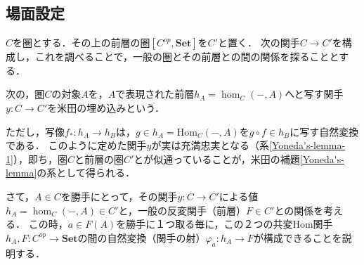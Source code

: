 \documentclass[uplatex, 12pt, dvipdfmx]{jsreport}
\begin{document}
\subsection{場面設定}

$C$を圏とする．その上の前層の圏$[C^{op},\mathbf{Set}]$を$C'$と置く．
次の関手$C\to C'$を構成し，これを調べることで，一般の圏とその前層との間の関係を探ることとする．

\begin{definition}
    次の，圏$C$の対象$A$を，$A$で表現された前層$h_A=\hom_C(-,A)$へと写す関手$y:C\to C'$を米田の埋め込みという．
    \begin{center}\end{center}
    ただし，写像$f_*:h_A\to h_B$は，$g\in h_A=\mathrm{Hom}_C(-,A)$を$g\circ f\in h_B$に写す自然変換である．
    このように定めた関手$y$が実は充満忠実となる（系\ref{Yoneda's-lemma-1}），即ち，圏$C$と前層の圏$C'$とが似通っていることが，米田の補題\ref{Yoneda's-lemma}の系として得られる．
\end{definition}

さて，$A\in C$を勝手にとって，その関手$y:C\to C'$による値$h_A=\hom_C(-,A) \in C'$と，一般の反変関手（前層）$F\in C'$との関係を考える．
この時，$a\in F(A)$を勝手に１つ取る毎に，この２つの共変Hom関手$h_A,F:C^{op}\to \mathbf{Set}$の間の自然変換（関手の射）$\varphi_a:h_A\to F$が構成できることを説明する．
\end{document}
